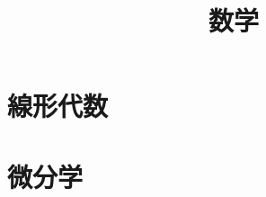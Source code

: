 \documentclass{jsarticle}
\title{数学}
\author{}
\date{}
\begin{document}
\maketitle
\tableofcontents

\section{線形代数}






\section{微分学}


\end{document}

